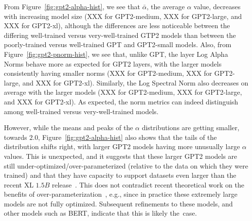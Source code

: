 From Figure~\ref{fig:gpt2-alpha-hist}, we see that
$\bar{\alpha}$, the average $\alpha$ value, decreases with increasing model size (XXX for GPT2-medium, XXX for GPT2-large, and XXX for GPT2-xl), although the differences are less noticeable between the differing well-trained versus very-well-trained GTP2 models than between the poorly-trained versus well-trained GPT and GPT2-small models.
Also, from Figure~\ref{fig:gpt2-pnorm-hist}, we see that, 
unlike GPT, the layer Log Alpha Norms behave more as expected for GPT2 layers, with the larger models consistently having smaller norms (XXX for GPT2-medium, XXX for GPT2-large, and XXX for GPT2-xl). 
Similarly, the Log Spectral Norm also decreases on average with the larger models (XXX for GPT2-medium, XXX for GPT2-large, and XXX for GPT2-xl).
As expected, the norm metrics can indeed distinguish among well-trained versus very-well-trained models.

However, while the means and peaks of the $\alpha$ distributions are getting smaller, towards $2.0$, Figure~\ref{fig:gpt2-alpha-hist} also shows that the tails of the distribution shifts right, with larger GPT2 models having more unusually large $\alpha$ values.
This is unexpected, and it suggests that these larger GPT2 models are still under-optimized/over-parameterized (relative to the data on which they were trained) and that they have capacity to support datasets even larger than the recent XL $1.5B$ release~\cite{gpt2-xl}.
This does not contradict recent theoretical work on the benefits of over-parameterization~\cite{BHMM19}, e.g., since in practice these extremely large models are not fully optimized.
Subsequent refinements to these models, and other models such as BERT, indicate that this is likely the~case.

